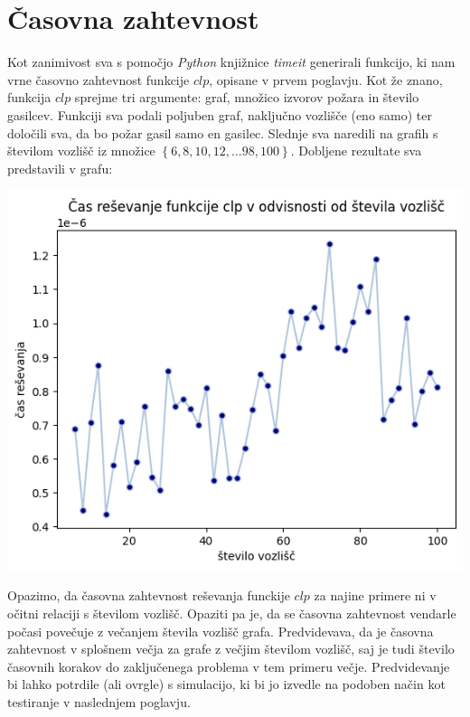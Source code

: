 \documentclass[a4paper, 12pt]{article}
\begin{document}
\pagebreak


\section{Časovna zahtevnost}
\overfullrule=0pt

Kot zanimivost sva s pomočjo \emph{Python} knjižnice \emph{timeit} generirali funkcijo, ki nam 
vrne časovno zahtevnost funkcije $clp$, opisane v prvem poglavju. 
Kot že znano, funkcija $clp$ sprejme tri argumente: graf, množico izvorov požara in
število gasilcev. Funkciji sva podali poljuben graf, naključno vozlišče (eno samo) ter
določili sva, da bo požar gasil samo en gasilec.
Slednje sva naredili na grafih s številom vozlišč iz množice $ \left\{ 6, 8, 10, 12, \ldots 98, 100 \right\} $.
Dobljene rezultate sva predstavili v grafu: \\

\begin{center}
    \includegraphics[scale=0.7]{cas}
\end{center}

\noindent Opazimo, da časovna zahtevnost reševanja funckije $clp$ za najine primere ni v očitni relaciji s
številom vozlišč. Opaziti pa je, da se časovna zahtevnost vendarle počasi povečuje z večanjem števila vozlišč 
grafa.
Predvidevava, da je časovna zahtevnost v splošnem večja za grafe z večjim 
številom vozlišč, saj je tudi število časovnih korakov do zaključenega problema v
tem primeru večje. Predvidevanje bi lahko potrdile (ali ovrgle) s simulacijo, ki bi jo izvedle
na podoben način kot testiranje v naslednjem poglavju. 
\end{document}
